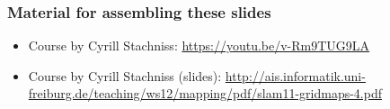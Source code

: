     \begin{frame}
    \frametitle{Material for assembling these slides}
    
    \begin{itemize}
    \item Course by Cyrill Stachniss: \url{https://youtu.be/v-Rm9TUG9LA}
    
    \item Course by Cyrill Stachniss (slides): \url{http://ais.informatik.uni-freiburg.de/teaching/ws12/mapping/pdf/slam11-gridmaps-4.pdf}
     \end{itemize}
\end{frame}